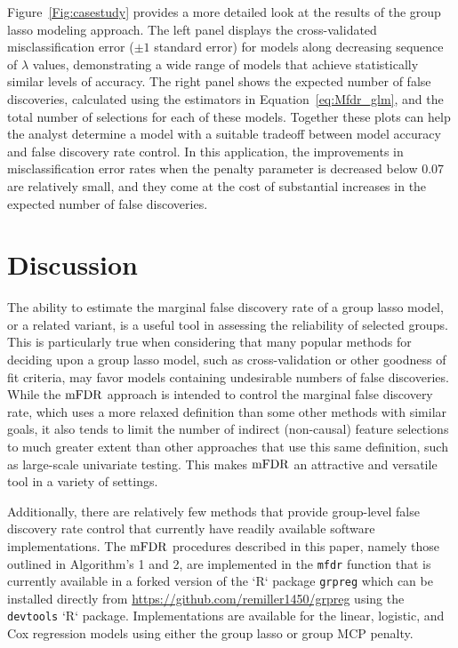 Figure~\ref{Fig:casestudy} provides a more detailed look at the results of the group lasso modeling approach. The left panel displays the cross-validated misclassification error ($\pm 1$ standard error) for models along decreasing sequence of $\lambda$ values, demonstrating a wide range of models that achieve statistically similar levels of accuracy. The right panel shows the expected number of false discoveries, calculated using the estimators in Equation~\ref{eq:Mfdr_glm}, and the total number of selections for each of these models. Together these plots can help the analyst determine a model with a suitable tradeoff between model accuracy and false discovery rate control. In this application, the improvements in misclassification error rates when the penalty parameter is decreased below 0.07 are relatively small, and they come at the cost of substantial increases in the expected number of false discoveries.

\section{Discussion}

The ability to estimate the marginal false discovery rate of a group lasso model, or a related variant, is a useful tool in assessing the reliability of selected groups. This is particularly true when considering that many popular methods for deciding upon a group lasso model, such as cross-validation or other goodness of fit criteria, may favor models containing undesirable numbers of false discoveries. While the $\textrm{mFDR}$ approach is intended to control the marginal false discovery rate, which uses a more relaxed definition than some other methods with similar goals, it also tends to limit the number of indirect (non-causal) feature selections to much greater extent than other approaches that use this same definition, such as large-scale univariate testing. This makes $\textrm{mFDR}$ an attractive and versatile tool in a variety of settings.

Additionally, there are relatively few methods that provide group-level false discovery rate control that currently have readily available software implementations. The $\textrm{mFDR}$ procedures described in this paper, namely those outlined in Algorithm's 1 and 2, are implemented in the {\tt mfdr} function that is currently available in a forked version of the `R` package {\tt grpreg} \citep{Breheny2009} which can be installed directly from \url{https://github.com/remiller1450/grpreg} using the {\tt devtools} `R` package. Implementations are available for the linear, logistic, and Cox regression models using either the group lasso or group MCP penalty. 

